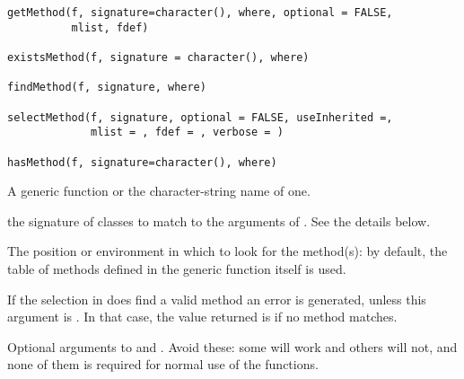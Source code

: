 %
\begin{Usage}
\begin{verbatim}
getMethod(f, signature=character(), where, optional = FALSE,
          mlist, fdef)

existsMethod(f, signature = character(), where)

findMethod(f, signature, where)

selectMethod(f, signature, optional = FALSE, useInherited =,
             mlist = , fdef = , verbose = )

hasMethod(f, signature=character(), where)

\end{verbatim}
\end{Usage}
%
\begin{Arguments}
\begin{ldescription}
\item[\code{f}] A  generic function or the character-string name of one.
\item[\code{signature}] the signature of classes to match to the arguments
of .  See the details below.


\item[\code{where}] The position or environment in which to look for the
method(s):  by default, the table of methods defined in the generic function itself is used.

\item[\code{optional}]  If the selection in   does find a valid method
an error is generated, unless this argument is .  In that
case, the value returned is   if no
method matches.
\item[\code{mlist, fdef, useInherited, verbose}] Optional arguments  to   and .  Avoid these: some will work and others will not, and none of them is required for normal use of the functions.


\end{ldescription}
\end{Arguments}
%
